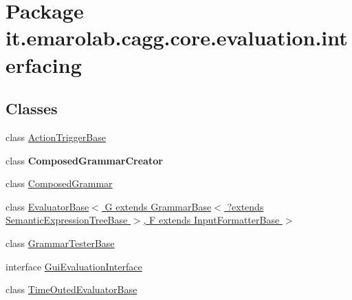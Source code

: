 \hypertarget{namespaceit_1_1emarolab_1_1cagg_1_1core_1_1evaluation_1_1interfacing}{\section{Package it.\-emarolab.\-cagg.\-core.\-evaluation.\-interfacing}
\label{namespaceit_1_1emarolab_1_1cagg_1_1core_1_1evaluation_1_1interfacing}
}
\subsection*{Classes}
\begin{DoxyCompactItemize}
\item 
class \hyperlink{classit_1_1emarolab_1_1cagg_1_1core_1_1evaluation_1_1interfacing_1_1ActionTriggerBase}{Action\-Trigger\-Base}
\item 
class {\bfseries Composed\-Grammar\-Creator}
\item 
class \hyperlink{classit_1_1emarolab_1_1cagg_1_1core_1_1evaluation_1_1interfacing_1_1ComposedGrammar}{Composed\-Grammar}
\item 
class \hyperlink{classit_1_1emarolab_1_1cagg_1_1core_1_1evaluation_1_1interfacing_1_1EvaluatorBase_3_01G_01extendd61d057930241954f97ab0cbf4992dd1}{Evaluator\-Base$<$ G extends Grammar\-Base$<$ ?extends Semantic\-Expression\-Tree\-Base $>$, F extends Input\-Formatter\-Base $>$}
\item 
class \hyperlink{classit_1_1emarolab_1_1cagg_1_1core_1_1evaluation_1_1interfacing_1_1GrammarTesterBase}{Grammar\-Tester\-Base}
\item 
interface \hyperlink{interfaceit_1_1emarolab_1_1cagg_1_1core_1_1evaluation_1_1interfacing_1_1GuiEvaluationInterface}{Gui\-Evaluation\-Interface}
\item 
class \hyperlink{classit_1_1emarolab_1_1cagg_1_1core_1_1evaluation_1_1interfacing_1_1TimeOutedEvaluatorBase}{Time\-Outed\-Evaluator\-Base}
\end{DoxyCompactItemize}
